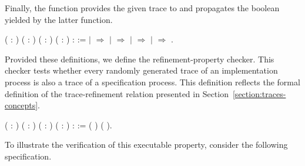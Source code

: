 Finally, the function  provides the given trace to  and propagates the boolean yielded by the latter function.
	
\begin{coqdoccode}
	\coqdocnoindent
	 \coqdoceol
	\coqdocindent{1.00em}
	( : )
	( : )
	( : )\coqdoceol
	\coqdocindent{1.00em}
	( :  ) :  :=\coqdoceol
	\coqdocindent{1.00em}
	  \coqdoceol
	\coqdocindent{1.00em}
	\ensuremath{|}  \ensuremath{\Rightarrow} \coqdoceol
	\coqdocindent{1.00em}
	\ensuremath{|}   \ensuremath{\Rightarrow}\coqdoceol
	\coqdocindent{2.00em}
	      \coqdoceol
	\coqdocindent{2.00em}
	\ensuremath{|}  \ensuremath{\Rightarrow} \coqdoceol
	\coqdocindent{2.00em}
	\ensuremath{|}   \ensuremath{\Rightarrow} \coqdoceol
	\coqdocindent{2.00em}
	\coqdoceol
	\coqdocindent{1.00em}
	.\coqdoceol
\end{coqdoccode}

Provided these definitions, we define the refinement-property checker. This checker tests whether every randomly generated trace of an implementation process is also a trace of a specification process. This definition reflects the formal definition of the trace-refinement relation presented in Section~\ref{section:traces-concepts}.

\begin{coqdoccode}
	\coqdocnoindent
	 \coqdoceol
	\coqdocindent{1.00em}
	( : )
	(  : )
	( : )
	( : ) :  :=\coqdoceol
	\coqdocindent{2.00em}
	 (   ) (   ).\coqdoceol
\end{coqdoccode}

To illustrate the verification of this executable property, consider the following \CSPcoq{} specification.

